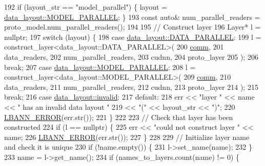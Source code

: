 \begin{DoxyCode}
192     \textcolor{keywordflow}{if} (layout\_str == \textcolor{stringliteral}{"model\_parallel"}) \{ layout = \hyperlink{base_8hpp_a786677cbfb3f5677b4d84f3056eb08dbac94d7b0e44ab8bdcdad694a673cdeae0}{data\_layout::MODEL\_PARALLEL}; 
      \}
193     \textcolor{keyword}{const} \textcolor{keyword}{auto}& num\_parallel\_readers = proto\_model.num\_parallel\_readers();
194 
195     \textcolor{comment}{// Construct layer}
196     Layer* l = \textcolor{keyword}{nullptr};
197     \textcolor{keywordflow}{switch} (layout) \{
198     \textcolor{keywordflow}{case} \hyperlink{base_8hpp_a786677cbfb3f5677b4d84f3056eb08dba37d2a3465f7cbf4ab60f4e79944d0638}{data\_layout::DATA\_PARALLEL}:
199       l = construct\_layer<data\_layout::DATA\_PARALLEL>(
200             \hyperlink{file__io_8cpp_ab048c6f9fcbcfaa57ce68b00263dbebe}{comm},
201             data\_readers,
202             num\_parallel\_readers,
203             cudnn,
204             proto\_layer
205           );
206       \textcolor{keywordflow}{break};
207     \textcolor{keywordflow}{case} \hyperlink{base_8hpp_a786677cbfb3f5677b4d84f3056eb08dbac94d7b0e44ab8bdcdad694a673cdeae0}{data\_layout::MODEL\_PARALLEL}:
208       l = construct\_layer<data\_layout::MODEL\_PARALLEL>(
209             \hyperlink{file__io_8cpp_ab048c6f9fcbcfaa57ce68b00263dbebe}{comm},
210             data\_readers,
211             num\_parallel\_readers,
212             cudnn,
213             proto\_layer
214           );
215       \textcolor{keywordflow}{break};
216     \textcolor{keywordflow}{case} \hyperlink{base_8hpp_a786677cbfb3f5677b4d84f3056eb08dbafedb2d84cafe20862cb4399751a8a7e3}{data\_layout::invalid}:
217     \textcolor{keywordflow}{default}:
218       err << \textcolor{stringliteral}{"layer "} << name << \textcolor{stringliteral}{" has an invalid data layout "}
219           << \textcolor{stringliteral}{"("} << layout\_str << \textcolor{stringliteral}{")"};
220       \hyperlink{base_8hpp_a80b1d707117e968a6951b7222e4b2b87}{LBANN\_ERROR}(err.str());
221     \}
222 
223     \textcolor{comment}{// Check that layer has been constructed}
224     \textcolor{keywordflow}{if} (l == \textcolor{keyword}{nullptr}) \{
225       err << \textcolor{stringliteral}{"could not construct layer "} << name;
226       \hyperlink{base_8hpp_a80b1d707117e968a6951b7222e4b2b87}{LBANN\_ERROR}(err.str());
227     \}
228 
229     \textcolor{comment}{// Initialize layer name and check it is unique}
230     \textcolor{keywordflow}{if} (!name.empty()) \{
231       l->set\_name(name);
232     \}
233     name = l->get\_name();
234     \textcolor{keywordflow}{if} (names\_to\_layers.count(name) != 0) \{

\end{DoxyCode}

